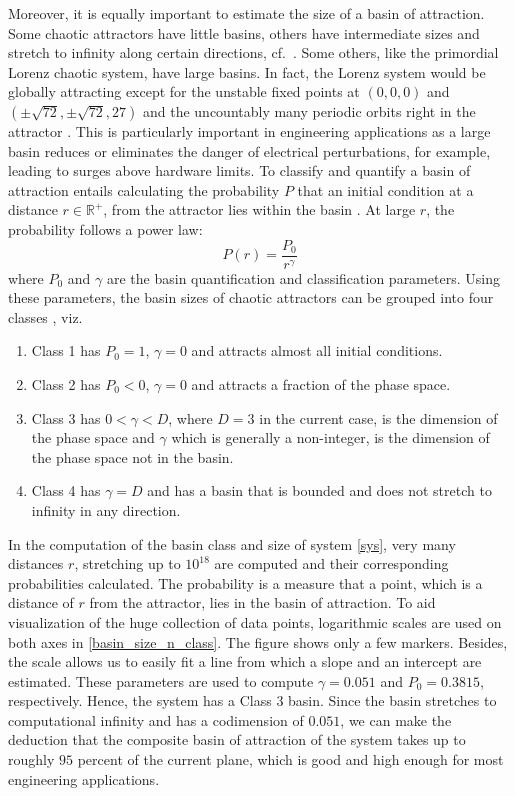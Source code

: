 \documentclass[final,5p,times,twocolumn]{elsarticle}
\begin{document}
Moreover, it is equally important to estimate the size of a basin of attraction. Some chaotic attractors have little basins, others have intermediate sizes and stretch to infinity along certain directions, cf.~\cite{perez2020luenberger}. Some others, like the primordial Lorenz chaotic system, have large basins. In fact, the Lorenz system would be globally attracting except for the unstable fixed points at $(0,0,0)$ and $(\pm\sqrt{72},\pm\sqrt{72},27)$ and the uncountably many periodic orbits right in the attractor \cite{sprott2015classifying}. This is particularly important in engineering applications as a large basin reduces or eliminates the danger of electrical perturbations, for example, leading to surges above hardware limits. To classify and quantify a basin of attraction entails calculating the probability $P$ that an initial condition at a distance $r\in\mathbb{R}^{+}$, from the attractor lies within the basin \cite{sprott2015classifying}. At large $r$, the probability follows a power law:
\begin{equation}
P(r) =\frac{P_0}{r^\gamma}
\end{equation}
where $P_0$ and $\gamma$ are the basin quantification and classification parameters. Using these parameters, the basin sizes of chaotic attractors can be grouped into four classes \cite{sprott2015classifying}, viz. 
\begin{enumerate}
	\item Class 1 has $P_0=1$, $\gamma=0$ and attracts almost all initial conditions.
	\item Class 2 has $P_0<0$, $\gamma=0$ and attracts a fraction of the phase space.
	\item Class 3 has $0<\gamma<D$, where $D=3$ in the current case, is the dimension of the phase space and $\gamma$ which is generally a non-integer, is the dimension of the phase space not in the basin.
	\item Class 4 has $\gamma = D$ and has a basin that is bounded and does not stretch to infinity in any direction.
\end{enumerate}
In the computation of the basin class and size of system \eqref{sys}, very many distances $r$, stretching up to $10^{18}$ are computed and their corresponding probabilities calculated. The probability is a measure that a point, which is a distance of $r$ from the attractor, lies in the basin of attraction. To aid visualization of the huge collection of data points, logarithmic scales are used on both axes in \cref{basin_size_n_class}. The figure shows only a few markers. Besides, the scale allows us to easily fit a line from which a slope and an intercept are estimated. These parameters are used to compute $\gamma=0.051$ and $P_0=0.3815$, respectively. Hence, the system has a Class 3 basin. Since the basin stretches to computational infinity and has a codimension of $0.051$, we can make the deduction that the composite basin of attraction of the system takes up to roughly $95$ percent of the current plane, which is good and high enough for most engineering applications.
\end{document}
